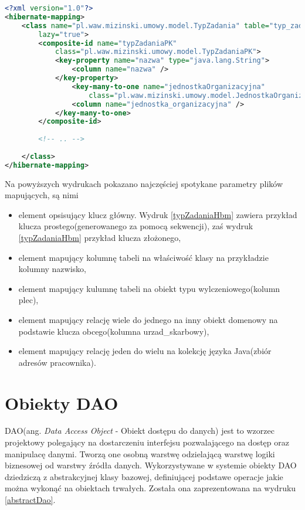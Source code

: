 \begin{lstlisting}[language=XML,style=outcode,showstringspaces=false,caption=Przykład pliku mapującego Hibernate wykorzystującego klucz złożony,label={typZadaniaHbm}]
<?xml version="1.0"?>
<hibernate-mapping>
	<class name="pl.waw.mizinski.umowy.model.TypZadania" table="typ_zadania"
		lazy="true">
		<composite-id name="typZadaniaPK" 
			class="pl.waw.mizinski.umowy.model.TypZadaniaPK">
			<key-property name="nazwa" type="java.lang.String">
				<column name="nazwa" />
			</key-property>
				<key-many-to-one name="jednostkaOrganizacyjna" 
					class="pl.waw.mizinski.umowy.model.JednostkaOrganizacyjna">
				<column name="jednostka_organizacyjna" />
			</key-many-to-one>
		</composite-id>
		
		<!-- .. -->
	
	</class>
</hibernate-mapping>
\end{lstlisting}

Na powyższych wydrukach pokazano najczęściej spotykane parametry plików mapujących, są nimi
\begin{itemize}
	\item element opsisujący klucz główny. Wydruk \ref{typZadaniaHbm} zawiera przykład klucza prostego(generowanego za pomocą sekwencji), zaś wydruk \ref{typZadaniaHbm} przykład klucza złożonego,
	\item element mapujący kolumnę tabeli na właściwość klasy na przykładzie kolumny nazwisko,
	\item element mapujący kulumnę tabeli na obiekt typu wylczeniowego(kolumn plec),
	\item element mapujący relację wiele do jednego na inny obiekt domenowy na podstawie klucza obcego(kolumna urzad\_skarbowy),
	\item element mapujący relację jeden do wielu na kolekcję języka Java(zbiór adresów pracownika).
\end{itemize}


\section[Obiekty DAO][Obiekty DAO]{Obiekty DAO}
DAO(ang. \textit{Data Access Object} - Obiekt dostępu do danych) jest to wzorzec projektowy polegający na dostarczeniu interfejsu pozwalającego na dostęp oraz manipulacę danymi. Tworzą one osobną warstwę odzielającą warstwę logiki biznesowej od warstwy źródła danych. Wykorzystywane w systemie obiekty DAO dziedziczą z abstrakcyjnej klasy bazowej, definiującej podstawe operacje jakie można wykonąć na obiektach trwałych. Została ona zaprezentowana na wydruku \ref{abstractDao}.

